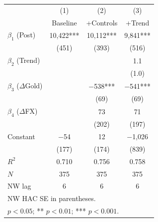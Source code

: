 \documentclass[12pt]{article}
\begin{document}
\vspace{0.5em}
\begin{center}
\begin{minipage}{\linewidth}
\centering
{}
\label{tab:its}
\small
\begin{tabular}{lccc}
\toprule
 & (1) & (2) & (3) \\
 & Baseline & +Controls & +Trend \\
\midrule
$\beta_1$ (Post) & 10,422*** & 10,112*** & 9,841*** \\
 & (451) & (393) & (516) \\
$\beta_2$ (Trend) & & & 1.1 \\
 & & & (1.0) \\
$\beta_3$ ($\Delta$Gold) & & $-$538*** & $-$541*** \\
 & & (69) & (69) \\
$\beta_4$ ($\Delta$FX) & & 73 & 71 \\
 & & (202) & (197) \\
Constant & $-$54 & 12 & $-$1,026 \\
 & (177) & (174) & (839) \\
\midrule
$R^2$ & 0.710 & 0.756 & 0.758 \\
$N$ & 375 & 375 & 375 \\
NW lag & 6 & 6 & 6 \\
\bottomrule
\multicolumn{4}{l}{\footnotesize NW HAC SE in parentheses.} \\
\multicolumn{4}{l}{\footnotesize * $p<0.05$; ** $p<0.01$; *** $p<0.001$.} \\
\end{tabular}
\end{minipage}
\end{center}
\vspace{0.5em}
\end{document}
